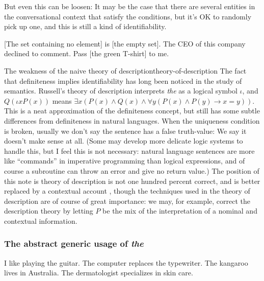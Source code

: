 \documentclass[UTF8, a4paper, oneside, scheme=plain, 12pt]{ctexbook}
\newcommand*{\citepage}[1]{p.~{#1}}
\newcommand{\form}[1]{\emph{#1}}
\begin{document}
But even this can be loosen:
It may be the case that there are several entities in the conversational context
that satisfy the conditions,
but it's OK to randomly pick up one,
and this is still a kind of identifiability.

\begin{exe}
    \ex\label{ex:np.det.math-1} [The set containing no element] is [the empty set].
    \ex\label{ex:np.det.decline-to-comment} The CEO of this company declined to comment.
    \ex\label{ex:np.det.conversation-1} Pass [the green T-shirt] to me.
\end{exe}

\begin{theorybox}{The weakness of the naive theory of description}{theory-of-description}
    The fact that definiteness implies identifiability has long been noticed in the study of semantics.
    Russell's theory of description interprets \form{the} 
    as a logical symbol $\iota$,
    and $Q(\iota x P(x))$
    means $\exists x (P(x) \land Q(x) \land \forall y (P(x) \land P(y) \rightarrow  x = y)) $.
    This is a neat approximation of the definiteness concept,
    but still has some subtle differences from definiteness in natural languages.
    When the uniqueness condition is broken, 
    usually we don't say the sentence has a false truth-value:
    We say it doesn't make sense at all.
    (Some may develop more delicate logic systems to handle this,
    but I feel this is not necessary:
    natural language sentences are more like 
    ``commands'' in imperative programming than logical expressions,
    and of course a subroutine can throw an error and give no return value.)
    The position of this note is 
    theory of description is not one hundred percent correct,
    and is better replaced by a contextual account \citep[\citepage{368}]{cgel},
    though the techniques used in the theory of description
    are of course of great importance:
    we may, for example, correct the description theory 
    by letting $P$ be the mix of the interpretation of a nominal and contextual information.
\end{theorybox}


\subsubsection{The abstract generic usage of \form{the}}

\begin{exe}
    \ex I like playing the guitar.
    \ex The computer replaces the typewriter.
    \ex The kangaroo lives in Australia.
    \ex The dermatologist specializes in skin care.
\end{exe}
\end{document}
